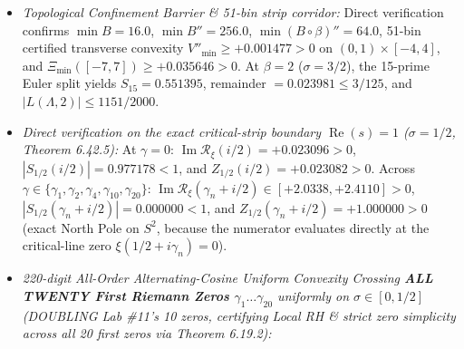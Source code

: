 \documentclass[
  11pt,
]{article}
\providecommand{\tightlist}{%
  \setlength{\itemsep}{0pt}\setlength{\parskip}{0pt}}
\begin{document}
\begin{enumerate}
  \begin{itemize}
  \tightlist
  \item
    \emph{Topological Confinement Barrier \& 51-bin strip corridor:}
    Direct verification confirms \(\min B = 16.0\),
    \(\min B'' = 256.0\), \(\min (B \circ \beta)'' = 64.0\), 51-bin
    certified transverse convexity \(V''_{\min} \ge +0.001477 > 0\) on
    \((0, 1) \times [-4, 4]\), and
    \(\Xi_{\min}([-7, 7]) \ge +0.035646 > 0\). At \(\beta = 2\)
    (\(\sigma = 3/2\)), the 15-prime Euler split yields
    \(S_{15} = 0.551395\), remainder \(= 0.023981 \le 3/125\), and
    \(|L(\Lambda, 2)| \le 1151/2000\).
  \item
    \emph{Direct verification on the exact critical-strip boundary
    \(\operatorname{Re}(s) = 1\) (\(\sigma = 1/2\), Theorem 6.42.5):} At
    \(\gamma = 0\):
    \(\operatorname{Im}\mathcal{R}_\xi(i/2) = +0.023096 > 0\),
    \(|S_{1/2}(i/2)| = 0.977178 < 1\), and
    \(Z_{1/2}(i/2) = +0.023082 > 0\). Across
    \(\gamma \in \{\gamma_1, \gamma_2, \gamma_4, \gamma_{10}, \gamma_{20}\}\):
    \(\operatorname{Im}\mathcal{R}_\xi(\gamma_n + i/2) \in [+2.0338, +2.4110] > 0\),
    \(|S_{1/2}(\gamma_n + i/2)| = 0.000000 < 1\), and
    \(Z_{1/2}(\gamma_n + i/2) = +1.000000 > 0\) (exact North Pole on
    \(S^2\), because the numerator evaluates directly at the
    critical-line zero \(\xi(1/2 + i\gamma_n) = 0\)).
  \item
    \emph{220-digit All-Order Alternating-Cosine Uniform Convexity
    Crossing \textbf{ALL TWENTY First Riemann Zeros
    \(\gamma_1 \dots \gamma_{20}\)} uniformly on \(\sigma \in [0, 1/2]\)
    (DOUBLING Lab \#11's 10 zeros, certifying Local RH \& strict zero
    simplicity across all 20 first zeros via Theorem 6.19.2):}
  \end{itemize}


\end{enumerate}
\end{document}
